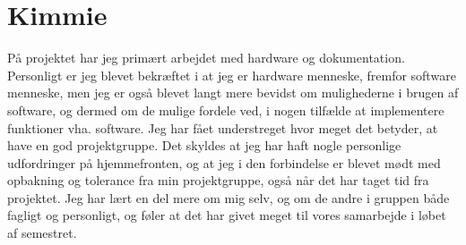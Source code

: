 \section{Kimmie}

På projektet har jeg primært arbejdet med hardware og dokumentation. Personligt er jeg blevet bekræftet i at jeg er hardware menneske, fremfor software menneske, men jeg er også blevet langt mere bevidst om mulighederne i brugen af software, og dermed om de mulige fordele ved, i nogen tilfælde at implementere funktioner vha. software.
Jeg har fået understreget hvor meget det betyder, at have en god projektgruppe. Det skyldes at jeg har haft nogle personlige udfordringer på hjemmefronten, og at jeg i den forbindelse er blevet mødt med opbakning og tolerance fra min projektgruppe, også når det har taget tid fra projektet. Jeg har lært en del mere om mig selv, og om de andre i gruppen både fagligt og personligt, og føler at det har givet meget til vores samarbejde i løbet af semestret. 